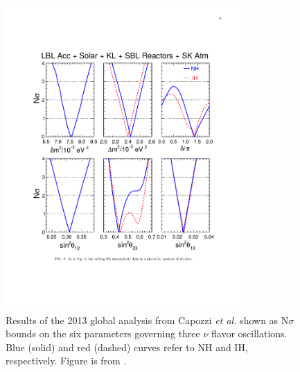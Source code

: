 \documentclass[letterpaper,11pt]{article}
\begin{document}
\begin{figure}[!htb]
  \centering\includegraphics[width=0.8\textwidth,clip,trim=2cm 50mm 2cm 4cm]{figs/fogli13_chisq.pdf}
  \caption[Measurement of the mixing parameters from Capozzi
  {\em et al.}]{Results of the 2013 global analysis from Capozzi {\em et al.} shown as
  N$\sigma$ bounds on the six parameters governing three $\nu$ flavor 
  oscillations. Blue (solid)
    and red (dashed) curves refer to NH and IH, respectively. 
    Figure is from \cite{Capozzi:2013csa}.}
  \label{fig:fogli2013pdfs}
\end{figure}
%
\end{document}
